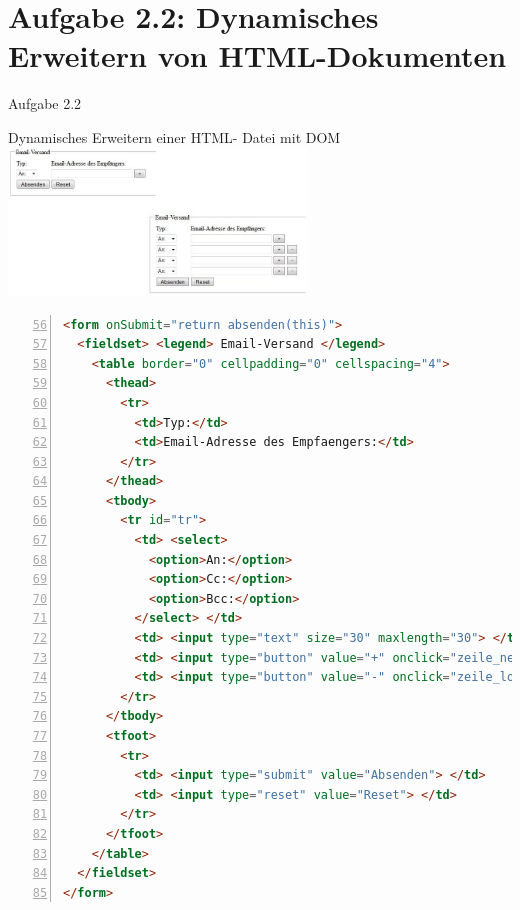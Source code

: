 \section{Aufgabe 2.2: Dynamisches Erweitern von HTML-Dokumenten}
\begin{frame}[<+->]{Aufgabe 2.2}
\begin{center}
\normalsize{
Dynamisches Erweitern einer HTML- Datei mit DOM}
\includegraphics[width = 300px]{../A2/src/formular1.jpg}
\end{center}
\end{frame}
\tiny{\begin{lstlisting}[language = HTML,
                                   mathescape = true, 
                   breaklines=true, 
                   numbers = left,
	        firstnumber= 56, 
                   numbersep = 3pt]
<form onSubmit="return absenden(this)">
  <fieldset> <legend> Email-Versand </legend>
    <table border="0" cellpadding="0" cellspacing="4">
      <thead>
        <tr>
          <td>Typ:</td>
          <td>Email-Adresse des Empfaengers:</td>
        </tr>
      </thead>
      <tbody>
        <tr id="tr">
          <td> <select>
            <option>An:</option>
            <option>Cc:</option>
            <option>Bcc:</option>
          </select> </td>
          <td> <input type="text" size="30" maxlength="30"> </td>
          <td> <input type="button" value="+" onclick="zeile_neu()"> </td>
          <td> <input type="button" value="-" onclick="zeile_loeschen(this.parentNode)" style="visibility:hidden"> </td>
        </tr>
      </tbody>
      <tfoot>
        <tr>
          <td> <input type="submit" value="Absenden"> </td>
          <td> <input type="reset" value="Reset"> </td>
        </tr>
      </tfoot>
    </table>
  </fieldset>
</form>
\end{lstlisting}}
